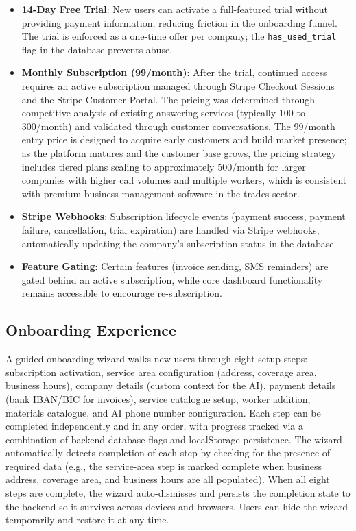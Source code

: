\documentclass[conference]{IEEEtran}
\begin{document}
\begin{itemize}
\item \textbf{14-Day Free Trial}: New users can activate a full-featured trial without providing payment information, reducing friction in the onboarding funnel. The trial is enforced as a one-time offer per company; the \texttt{has\_used\_trial} flag in the database prevents abuse.
\item \textbf{Monthly Subscription (\texteuro{}99/month)}: After the trial, continued access requires an active subscription managed through Stripe Checkout Sessions and the Stripe Customer Portal. The pricing was determined through competitive analysis of existing answering services (typically \texteuro{}100 to \texteuro{}300/month) and validated through customer conversations. The \texteuro{}99/month entry price is designed to acquire early customers and build market presence; as the platform matures and the customer base grows, the pricing strategy includes tiered plans scaling to approximately \texteuro{}500/month for larger companies with higher call volumes and multiple workers, which is consistent with premium business management software in the trades sector.
\item \textbf{Stripe Webhooks}: Subscription lifecycle events (payment success, payment failure, cancellation, trial expiration) are handled via Stripe webhooks, automatically updating the company's subscription status in the database.
\item \textbf{Feature Gating}: Certain features (invoice sending, SMS reminders) are gated behind an active subscription, while core dashboard functionality remains accessible to encourage re-subscription.
\end{itemize}

\subsection{Onboarding Experience}

A guided onboarding wizard walks new users through eight setup steps: subscription activation, service area configuration (address, coverage area, business hours), company details (custom context for the AI), payment details (bank IBAN/BIC for invoices), service catalogue setup, worker addition, materials catalogue, and AI phone number configuration. Each step can be completed independently and in any order, with progress tracked via a combination of backend database flags and localStorage persistence. The wizard automatically detects completion of each step by checking for the presence of required data (e.g., the service-area step is marked complete when business address, coverage area, and business hours are all populated). When all eight steps are complete, the wizard auto-dismisses and persists the completion state to the backend so it survives across devices and browsers. Users can hide the wizard temporarily and restore it at any time.
\end{document}
